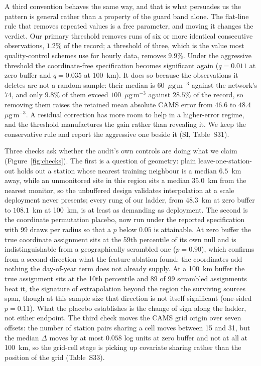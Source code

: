 \documentclass[review,times,authoryear]{elsarticle}
\newcommand*{\ugm}{\ensuremath{\mu\mathrm{g\,m^{-3}}}}
\begin{document}
A third convention behaves the same way, and that is what persuades us the pattern is general rather than a property of the guard band alone. The flat-line rule that removes repeated values is a free parameter, and moving it changes the verdict. Our primary threshold removes runs of six or more identical consecutive observations, $1.2\%$ of the record; a threshold of three, which is the value most quality-control schemes use for hourly data, removes $9.9\%$. Under the aggressive threshold the coordinate-free specification becomes significant again ($q=0.011$ at zero buffer and $q=0.035$ at 100~km). It does so because the observations it deletes are not a random sample: their median is $60$~\ugm{} against the network's $74$, and only $9.8\%$ of them exceed $100$~\ugm{} against $28.5\%$ of the record, so removing them raises the retained mean absolute CAMS error from $46.6$ to $48.4$~\ugm{}. A residual correction has more room to help in a higher-error regime, and the threshold manufactures the gain rather than revealing it. We keep the conservative rule and report the aggressive one beside it (SI, Table~S31).

Three checks ask whether the audit's own controls are doing what we claim (Figure~\ref{fig:checks}). The first is a question of geometry: plain leave-one-station-out holds out a station whose nearest training neighbour is a median $6.5$~km away, while an unmonitored site in this region sits a median $35.0$~km from the nearest monitor, so the unbuffered design validates interpolation at a scale deployment never presents; every rung of our ladder, from $48.3$~km at zero buffer to $108.1$~km at 100~km, is at least as demanding as deployment. The second is the coordinate permutation placebo, now run under the reported specification with 99 draws per radius so that a $p$ below $0.05$ is attainable. At zero buffer the true coordinate assignment sits at the 59th percentile of its own null and is indistinguishable from a geographically scrambled one ($p=0.90$), which confirms from a second direction what the feature ablation found: the coordinates add nothing the day-of-year term does not already supply. At a 100~km buffer the true assignment sits at the 10th percentile and 89 of 99 scrambled assignments beat it, the signature of extrapolation beyond the region the surviving sources span, though at this sample size that direction is not itself significant (one-sided $p=0.11$). What the placebo establishes is the change of sign along the ladder, not either endpoint. The third check moves the CAMS grid origin over seven offsets: the number of station pairs sharing a cell moves between 15 and 31, but the median $\Delta$ moves by at most $0.058$ log units at zero buffer and not at all at 100~km, so the grid-cell stage is picking up covariate sharing rather than the position of the grid (Table~S33).
\end{document}
